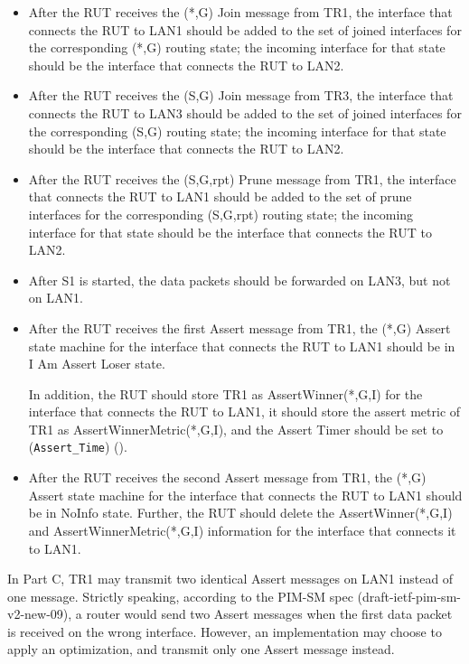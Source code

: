 \documentclass[11pt]{report}
\begin{document}

\begin{itemize}

  \item After the RUT receives the (*,G) Join message from TR1, the
  interface that connects the RUT to LAN1 should be
  added to the set of joined interfaces for the corresponding (*,G)
  routing state; the incoming interface for that state should be the
  interface that connects the RUT to LAN2.

  \item After the RUT receives the (S,G) Join message from TR3, the
  interface that connects the RUT to LAN3 should be
  added to the set of joined interfaces for the corresponding (S,G)
  routing state; the incoming interface for that state should be the
  interface that connects the RUT to LAN2.

  \item After the RUT receives the (S,G,rpt) Prune message from TR1, the
  interface that connects the RUT to LAN1 should be
  added to the set of prune interfaces for the corresponding (S,G,rpt)
  routing state; the incoming interface for that state should be the
  interface that connects the RUT to LAN2.

  \item After S1 is started, the data packets should be forwarded on LAN3, but
  not on LAN1.

  \item After the RUT receives the first Assert message from TR1, the (*,G)
  Assert state machine for the interface that connects the RUT to LAN1 should
  be in I Am Assert Loser state.

  In addition, the RUT should store TR1 as AssertWinner(*,G,I) for the
  interface that connects the RUT to LAN1, it should store the assert metric
  of TR1 as AssertWinnerMetric(*,G,I), and the Assert Timer should be set to
  (\verb=Assert_Time=) ({\PimsmAssertTime}).

  \item After the RUT receives the second Assert message from TR1, the (*,G)
  Assert state machine for the interface that connects the RUT to LAN1 should
  be in NoInfo state.
  Further, the RUT should delete the AssertWinner(*,G,I) and
  AssertWinnerMetric(*,G,I) information for the interface that connects it to
  LAN1.

\end{itemize}

In Part C, TR1 may transmit two identical Assert messages on LAN1 instead of
one message. Strictly speaking, according to the PIM-SM spec
(draft-ietf-pim-sm-v2-new-09), a router would send two Assert messages
when the first data packet is received on the wrong interface.
However, an implementation may choose to apply an optimization, and
transmit only one Assert message instead.
\end{document}
